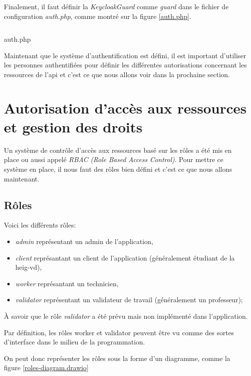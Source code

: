 \documentclass[
    iai, %
    il, %
]{heig-tb}
\begin{document}
Finalement, il faut définir la \emph{KeycloakGuard} comme \emph{guard} dans le fichier de configuration \emph{auth.php}, comme montré sur la figure \ref{auth.php}.

\begin{listing}[h]
    \inputminted{php}{assets/code/auth.php}
    \caption{auth.php \label{auth.php}}
\end{listing}

Maintenant que le système d'authentification est défini, il est important d'utiliser les personnes authentifiées pour définir les différentes autorisations concernant les ressources de l'\Gls{api} et c'est ce que nous allons voir dans la prochaine section.

\section{Autorisation d'accès aux ressources et gestion des droits}

Un système de contrôle d'accès aux ressources basé sur les rôles a été mis en place ou aussi appelé \emph{RBAC (Role Based Access Control)}.
Pour mettre ce système en place, il nous faut des rôles bien défini et c'est ce que nous allons maintenant.

\subsection{Rôles}
Voici les différents rôles:
\begin{itemize}
    \item \emph{admin} représentant un admin de l'application,
    \item \emph{client} représantant un client de l'application (généralement étudiant de la \Gls{heig-vd}),
    \item \emph{worker} représantant un technicien,
    \item \emph{validator} représentant un validateur de travail (généralement un professeur);
\end{itemize}

À savoir que le rôle \emph{validator} a été prévu mais non implémenté dans l'application.

Par définition, les rôles worker et validator peuvent être vu comme des sortes d'interface dans le milieu de la programmation.

On peut donc représenter les rôles sous la forme d'un diagramme, comme la figure \ref{roles-diagram.drawio}
\end{document}
